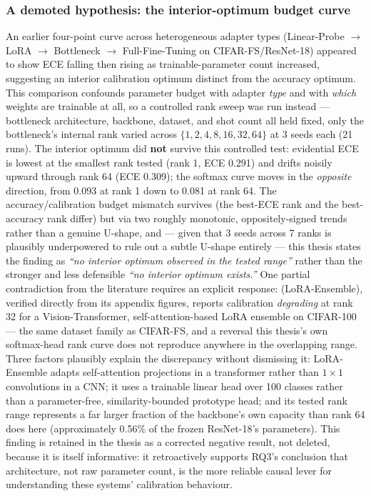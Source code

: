 \documentclass{iutbscthesis}
\begin{document}
\subsubsection{A demoted hypothesis: the interior-optimum budget curve}
\label{sec:results-rq5-demoted}

An earlier four-point curve across heterogeneous adapter types (Linear-Probe $\to$ LoRA $\to$ Bottleneck $\to$ Full-Fine-Tuning on CIFAR-FS/ResNet-18) appeared to show ECE falling then rising as trainable-parameter count increased, suggesting an interior calibration optimum distinct from the accuracy optimum. This comparison confounds parameter budget with adapter \emph{type} and with \emph{which} weights are trainable at all, so a controlled rank sweep was run instead — bottleneck architecture, backbone, dataset, and shot count all held fixed, only the bottleneck's internal rank varied across $\{1, 2, 4, 8, 16, 32, 64\}$ at 3 seeds each (21 runs). The interior optimum did \textbf{not} survive this controlled test: evidential ECE is lowest at the smallest rank tested (rank 1, ECE 0.291) and drifts noisily upward through rank 64 (ECE 0.309); the softmax curve moves in the \emph{opposite} direction, from 0.093 at rank 1 down to 0.081 at rank 64. The accuracy/calibration budget mismatch survives (the best-ECE rank and the best-accuracy rank differ) but via two roughly monotonic, oppositely-signed trends rather than a genuine U-shape, and — given that 3 seeds across 7 ranks is plausibly underpowered to rule out a subtle U-shape entirely — this thesis states the finding as \emph{``no interior optimum observed in the tested range''} rather than the stronger and less defensible \emph{``no interior optimum exists.''} One partial contradiction from the literature requires an explicit response: \textcite{muhlematter2026loraensemble} (LoRA-Ensemble), verified directly from its appendix figures, reports calibration \emph{degrading} at rank 32 for a Vision-Transformer, self-attention-based LoRA ensemble on CIFAR-100 — the same dataset family as CIFAR-FS, and a reversal this thesis's own softmax-head rank curve does not reproduce anywhere in the overlapping range. Three factors plausibly explain the discrepancy without dismissing it: LoRA-Ensemble adapts self-attention projections in a transformer rather than $1{\times}1$ convolutions in a CNN; it uses a trainable linear head over 100 classes rather than a parameter-free, similarity-bounded prototype head; and its tested rank range represents a far larger fraction of the backbone's own capacity than rank 64 does here (approximately 0.56\% of the frozen ResNet-18's parameters). This finding is retained in the thesis as a corrected negative result, not deleted, because it is itself informative: it retroactively supports RQ3's conclusion that architecture, not raw parameter count, is the more reliable causal lever for understanding these systems' calibration behaviour.
\end{document}
